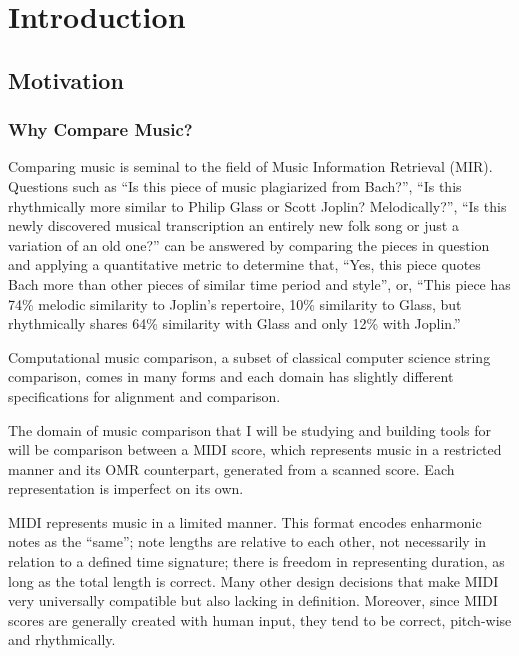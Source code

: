 \chapter{Introduction}

\section{Motivation}
\subsection{Why Compare Music?}
Comparing music is seminal to the field of Music Information Retrieval (MIR). Questions such as ``Is this piece of music plagiarized from Bach?'', ``Is this rhythmically more similar to Philip Glass or Scott Joplin? Melodically?'', ``Is this newly discovered musical transcription an entirely new folk song or just a variation of an old one?'' can be answered by comparing the pieces in question and applying a quantitative metric to determine that, ``Yes, this piece quotes Bach more than other pieces of similar time period and style'', or, ``This piece has 74\% melodic similarity to Joplin's repertoire, 10\% similarity to Glass, but rhythmically shares 64\% similarity with Glass and only 12\% with Joplin.''

Computational music comparison, a subset of classical computer science string comparison, comes in many forms and each domain has slightly different specifications for alignment and comparison. 

The domain of music comparison that I will be studying and building tools for will be comparison between a MIDI score, which represents music in a restricted manner and its OMR counterpart, generated from a scanned score. Each representation is imperfect on its own.

MIDI represents music in a limited manner. This format encodes enharmonic notes as the ``same''; note lengths are relative to each other, not necessarily in relation to a defined time signature; there is freedom in representing duration, as long as the total length is correct. Many other design decisions that make MIDI very universally compatible but also lacking in definition. Moreover, since MIDI scores are generally created with human input, they tend to be correct, pitch-wise and rhythmically. 
 
